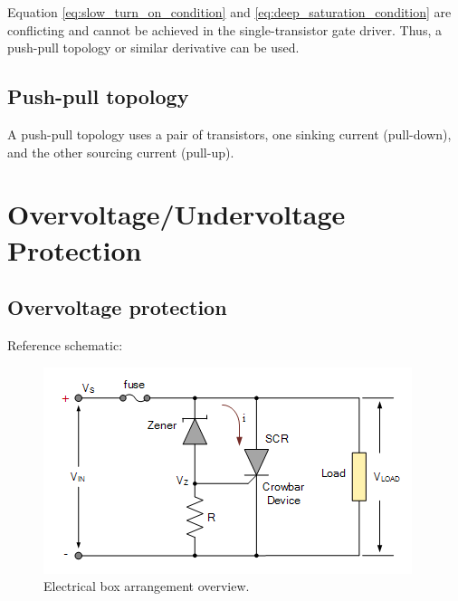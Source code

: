 \documentclass[main.tex]{subfiles}
\begin{document}
    \justify
    Equation \eqref{eq:slow_turn_on_condition} and \eqref{eq:deep_saturation_condition} are conflicting and cannot be achieved in the single-transistor gate driver. Thus, a push-pull topology or similar derivative can be used.

    \pagebreak
    \subsection{Push-pull topology}

    \justify
    A push-pull topology uses a pair of transistors, one sinking current (pull-down), and the other sourcing current (pull-up).
    
    \pagebreak

    \section{Overvoltage/Undervoltage Protection}

    \subsection{Overvoltage protection}

    \justify
    Reference schematic:

    \begin{figure}[!h]
        \centerline{\includegraphics[scale=0.5]{media/Zener_Crowbar_OVP.png}}
        \caption{Electrical box arrangement overview.}
        \label{fig:enclosure_arrange}
    \end{figure}
    
\end{document}

